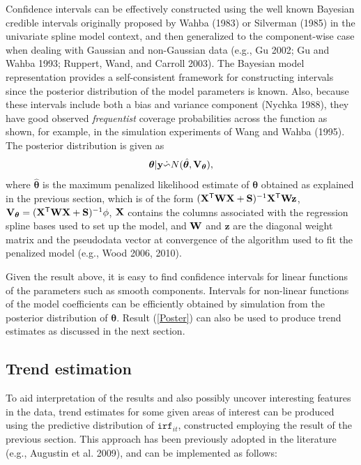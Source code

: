 \documentclass[10pt] {article}
\newcommand{\beq}{\begin{equation}}
\newcommand{\eeq}{\end{equation}}
\newcommand{\ts}{^{\sf T}}
\newcommand{\X}{{\bf X}}
\theoremstyle{definition}
\theoremstyle{plain}
\begin{document}
Confidence intervals can be effectively constructed using the well known Bayesian credible intervals originally proposed by Wahba (1983) or Silverman (1985) in the univariate spline model context, and then generalized to the component-wise case when dealing with Gaussian and non-Gaussian data (e.g., Gu 2002; Gu and Wahba 1993; Ruppert, Wand, and Carroll 2003). The Bayesian model representation provides a self-consistent framework for constructing intervals since the posterior distribution of the model parameters is known. Also, because these intervals include both a bias and variance component (Nychka 1988), they have good observed \textit{frequentist} coverage probabilities across the function as shown, for example, in the simulation experiments of Wang and Wahba (1995). The posterior distribution is given as
\beq
\bm\theta|{\bf y} \dot{\backsim} N( \hat{\bm\theta}, {\bf V}_{\bm\theta} ),
\label{Poster}
\eeq
where $\hat{\bm\theta}$ is the maximum penalized likelihood estimate of $\bm\theta$ obtained as explained in the previous section, which is of the form $(\X\ts{\bf W}\X+{\bf S})^{-1}\X\ts{\bf W}{\bf z}$, ${\bf V}_{\bm\theta} = (\X\ts{\bf W}\X+{\bf S})^{-1}\phi$, $\X$ contains the columns associated with the regression spline bases used to set up the model, and ${\bf W}$ and $\mathbf{z}$ are the diagonal weight matrix and the pseudodata vector at convergence of the algorithm used to fit the penalized model (e.g., Wood 2006, 2010).

Given the result above, it is easy to find confidence intervals for linear functions of the parameters such as smooth components. Intervals for non-linear functions of the model coefficients can be efficiently obtained by simulation from the posterior distribution of $\bm\theta$. Result (\ref{Poster}) can also be used to produce trend estimates as discussed in the next section.

\subsection{Trend estimation \label{TE}}
To aid interpretation of the results and also possibly uncover interesting features in the data, trend estimates for some given areas of interest can be produced using the predictive distribution of $\texttt{irf}_{it}$, constructed employing the result of the previous section. This approach has been previously adopted in the literature (e.g., Augustin et al. 2009), and can be implemented as follows:
\end{document}
